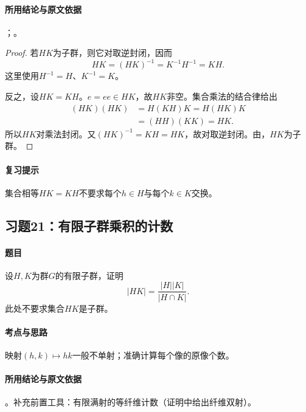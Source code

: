 \paragraph{所用结论与原文依据}
；。


\begin{proof}
若$HK$为子群，则它对取逆封闭，因而
\[
HK=(HK)^{-1}=K^{-1}H^{-1}=KH.
\]
这里使用$H^{-1}=H$、$K^{-1}=K$。

反之，设$HK=KH$。$e=ee\in HK$，故$HK$非空。集合乘法的结合律给出
\begin{align*}
(HK)(HK)&=H(KH)K=H(HK)K\\
&=(HH)(KK)=HK.
\end{align*}
所以$HK$对乘法封闭。又$(HK)^{-1}=KH=HK$，故对取逆封闭。由，$HK$为子群。
\end{proof}

\paragraph{复习提示}
集合相等$HK=KH$不要求每个$h\in H$与每个$k\in K$交换。


\subsection{习题21：\texorpdfstring{有限子群乘积的计数}{有限子群乘积的计数}}
\label{ex:1:21}

\paragraph{题目}
设$H,K$为群$G$的有限子群，证明
\[
|HK|=\frac{|H||K|}{|H\cap K|}.
\]
此处不要求集合$HK$是子群。

\paragraph{考点与思路}
映射$(h,k)\mapsto hk$一般不单射；准确计算每个像的原像个数。

\paragraph{所用结论与原文依据}
。补充前置工具：有限满射的等纤维计数（证明中给出纤维双射）。


